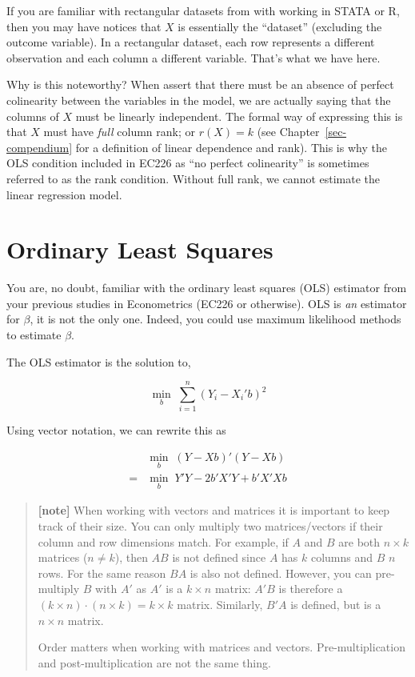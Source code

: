 \documentclass[
  letterpaper,
  DIV=11,
  numbers=noendperiod]{scrreprt}
\begin{document}
If you are familiar with rectangular datasets from with working in STATA
or R, then you may have notices that \(X\) is essentially the
``dataset'' (excluding the outcome variable). In a rectangular dataset,
each row represents a different observation and each column a different
variable. That's what we have here.

Why is this noteworthy? When assert that there must be an absence of
perfect colinearity between the variables in the model, we are actually
saying that the columns of \(X\) must be linearly independent. The
formal way of expressing this is that \(X\) must have \emph{full} column
rank; or \(r(X)=k\) (see Chapter~\ref{sec-compendium} for a definition
of linear dependence and rank). This is why the OLS condition included
in EC226 as ``no perfect colinearity'' is sometimes referred to as the
rank condition. Without full rank, we cannot estimate the linear
regression model.


\hypertarget{ordinary-least-squares}{%
\chapter{Ordinary Least Squares}\label{ordinary-least-squares}}

You are, no doubt, familiar with the ordinary least squares (OLS)
estimator from your previous studies in Econometrics (EC226 or
otherwise). OLS is \emph{an} estimator for \(\beta\), it is not the only
one. Indeed, you could use maximum likelihood methods to estimate
\(\beta\).

The OLS estimator is the solution to,

\[ \min_b\;\sum_{i=1}^n(Y_i-X_i'b)^2 \]

Using vector notation, we can rewrite this as

\[ \begin{align} &\min_b\;(Y-Xb)'(Y-Xb)\\ =&\min_b\;Y'Y-2b'X'Y+b'X'Xb \end{align} \]

\begin{quote}
\textbf{{[}note{]}} When working with vectors and matrices it is
important to keep track of their size. You can only multiply two
matrices/vectors if their column and row dimensions match. For example,
if \(A\) and \(B\) are both \(n\times k\) matrices (\(n\neq k\)), then
\(AB\) is not defined since \(A\) has \(k\) columns and \(B\) \(n\)
rows. For the same reason \(BA\) is also not defined. However, you can
pre-multiply \(B\) with \(A'\) as \(A'\) is a \(k\times n\) matrix:
\(A'B\) is therefore a \((k\times n)\cdot (n\times k)=k\times k\)
matrix. Similarly, \(B'A\) is defined, but is a \(n\times n\) matrix.

Order matters when working with matrices and vectors. Pre-multiplication
and post-multiplication are not the same thing.
\end{quote}
\end{document}
